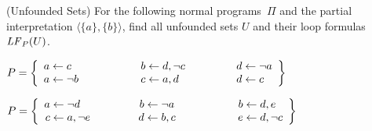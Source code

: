 \begin{Uebung}{(Unfounded Sets)}%
For the following normal programs~$\Pi$ and the partial interpretation
$\langle\{a\},\{b\}\rangle$,
find all unfounded sets $U$ and their loop formulas $\mathit{LF}_{P}(U)$.
\begin{UList}
\item
\(
\Pi =
\left\{
\begin{array}{r@{}c@{}l@{\hspace{20mm}}r@{}c@{}l@{\hspace{16.5mm}}r@{}c@{}l}
a & {} \leftarrow {} & c &
b & {} \leftarrow {} & d,\naf{c} &
d & {} \leftarrow {} & \naf{a}
\\
a & {} \leftarrow {} & \naf{b} &
c & {} \leftarrow {} & a,d &
d & {} \leftarrow {} & c
\end{array}
\right\}
\)
%
\item
\(
\Pi =
\left\{
\begin{array}{r@{}c@{}l@{\hspace{15.5mm}}r@{}c@{}l@{\hspace{20mm}}r@{}c@{}l}
a & {} \leftarrow {} & \naf{d} &
b & {} \leftarrow {} & \naf{a} &
b & {} \leftarrow {} & d,e
\\
c & {} \leftarrow {} & a,\naf{e} &
d & {} \leftarrow {} & b,c &
e & {} \leftarrow {} & d,\naf{c}
\end{array}
\right\}
\)
\end{UList}
\end{Uebung}


